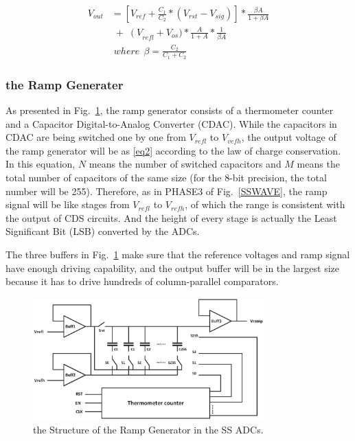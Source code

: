 \documentclass[conference]{IEEEtran}
\begin{document}
\begin{equation}
\begin{aligned}
	V_{out}&=\left[ V_{ref}+\frac{C_1}{C_2}\ast\left(V_{rst}-V_{sig}\right)\right]\ast\frac{\beta A}{1+\beta A}\\
	 &\;{+}\;\left(V\right._{refl}+V_{os})\ast\frac{A}{1+A}\ast\frac{1}{\beta A}\\
	 &\;where\ \ \beta=\frac{C_2}{C_1+C_2}
	\label{eq1}
\end{aligned}
\end{equation}

\subsubsection{the Ramp Generater}

As presented in Fig.~\ref{RAMP}, the ramp generator consists of a thermometer counter and a Capacitor Digital-to-Analog Converter (CDAC). 
While the capacitors in CDAC are being switched one by one from $V_{refl}$ to $V_{vefh}$, the output voltage of the ramp generator will be as \eqref{eq2} according to the law of charge conservation. 
In this equation, $N$ means the number of switched capacitors and $M$ means the total number of capacitors of the same size (for the 8-bit precision, the total number will be 255). 
Therefore, as in PHASE3 of Fig.~\ref{SSWAVE}, the ramp signal will be like stages from $V_{refl}$ to $V_{refh}$, of which the range is consistent with the output of CDS circuits. 
And the height of every stage is actually the Least Significant Bit (LSB) converted by the ADCs.
 
The three buffers in Fig.~\ref{RAMP} make sure that the reference voltages and ramp signal have enough driving capability, 
and the output buffer will be in the largest size because it has to drive hundreds of column-parallel comparators.

\begin{figure}[htbp]
	\centerline{\includegraphics[width=3.5in]{./Figures/RAMP.eps}}
	\caption{the Structure of the Ramp Generator in the SS ADCs.}
	\label{RAMP}
\end{figure} 
\end{document}
